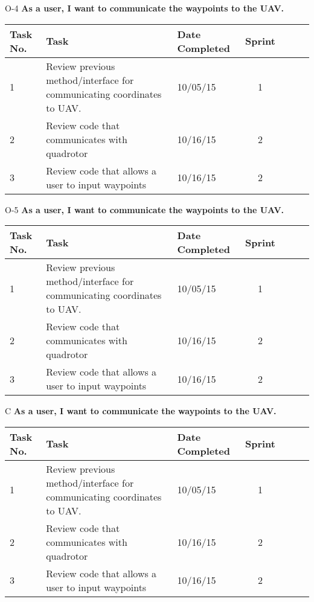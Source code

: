 \documentclass[11pt]{beamer}
\begin{document}
\begin{frame}{O-4}
\textbf{As a user, I want to communicate the waypoints to the UAV.}
\begin{tabular}{| p{1cm} | lp{2cm} | cp{2cm} | cp{1cm} |}\hline
Task No. & Task & Date Completed & Sprint\\\hline
1 & Review previous method/interface for communicating coordinates to UAV. & 10/05/15 & 1 \\\hline
2 & Review code that communicates with quadrotor & 10/16/15 & 2 \\\hline
3 & Review code that allows a user to input waypoints & 10/16/15 & 2\\\hline

\end{tabular}
\end{frame}


\begin{frame}{O-5}
\textbf{As a user, I want to communicate the waypoints to the UAV.}
\begin{tabular}{| p{1cm} | lp{2cm} | cp{2cm} | cp{1cm} |}\hline
Task No. & Task & Date Completed & Sprint\\\hline
1 & Review previous method/interface for communicating coordinates to UAV. & 10/05/15 & 1 \\\hline
2 & Review code that communicates with quadrotor & 10/16/15 & 2 \\\hline
3 & Review code that allows a user to input waypoints & 10/16/15 & 2\\\hline

\end{tabular}
\end{frame}


\begin{frame}{C}
\textbf{As a user, I want to communicate the waypoints to the UAV.}
\begin{tabular}{| p{1cm} | lp{2cm} | cp{2cm} | cp{1cm} |}\hline
Task No. & Task & Date Completed & Sprint\\\hline
1 & Review previous method/interface for communicating coordinates to UAV. & 10/05/15 & 1 \\\hline
2 & Review code that communicates with quadrotor & 10/16/15 & 2 \\\hline
3 & Review code that allows a user to input waypoints & 10/16/15 & 2\\\hline

\end{tabular}
\end{frame}
\end{document}
